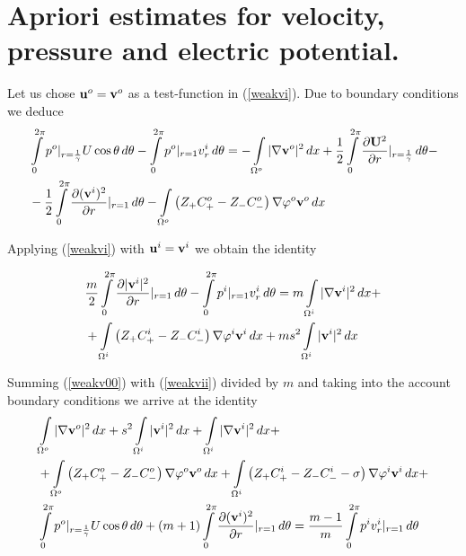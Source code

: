 \documentclass{amsart}
\begin{document}
\section{Apriori estimates for velocity, pressure and electric potential.}
Let us chose ${\bf u}^o={\bf v}^o$ as a test-function in (\ref{weakvi}). Due to boundary conditions we deduce
\begin{equation}\label{weakv00}
\begin{aligned}                 
&\int\limits_{0}^{2\pi}p^o|_{r=\frac{1}{\gamma}} U\cos\theta\,d\theta-\int\limits_{0}^{2\pi}p^o|_{r=1}{v_r^i}\,d\theta=-\int\limits_{\Omega^o}|\nabla{\bf v}^o|^2\,dx+\frac{1}{2}\int\limits_{0}^{2\pi}\frac{\partial {\bf U}^2 }{\partial r}|_{r=\frac{1}{\gamma}}\,d\theta-\\
&-\frac{1}{2}\int\limits_{0}^{2\pi}\frac{\partial ({\bf v}^i)^2} {\partial r}|_{r=1}\,d\theta
-\int\limits_{\Omega^o}\left(Z_{+}C^o_{+}-Z_{-}C^o_{-}\right)\nabla{\varphi^o}{\bf v}^o\,dx
\end{aligned}
\end{equation}

Applying (\ref{weakvi}) with ${\bf u}^i={\bf v}^i$ we obtain the identity

\begin{equation}\label{weakvii}
\begin{aligned}
&\frac{m}{2}\int\limits_{0}^{2\pi}\frac{\partial {|{\bf v}^i|^2} }{\partial r}|_{r=1}\,d\theta-\int\limits_{0}^{2\pi}p^i|_{r=1}{v_r^i}\,d\theta=m\int\limits_{\Omega^i}|\nabla{\bf v}^i|^2\,dx+\\
&+\int\limits_{\Omega^i}\left(Z_{+}C^i_{+}-Z_{-}C^i_{-}\right)\nabla{\varphi^i}{\bf v}^i\,dx+ms^2\int\limits_{\Omega^i}|{\bf v}^i|^2\,dx
\end{aligned}
\end{equation}

Summing (\ref{weakv00}) with (\ref{weakvii}) divided by $m$ and taking into the account boundary conditions we arrive at the identity
\begin{equation}\label{weakvsum}
\begin{aligned}
&\int\limits_{\Omega^o}|\nabla{\bf v}^o|^2\,dx+s^2\int\limits_{\Omega^i}|{\bf v}^i|^2\,dx+\int\limits_{\Omega^i}|\nabla{\bf v}^i|^2\,dx+\\
&+\int\limits_{\Omega^o}\left(Z_{+}C^o_{+}-Z_{-}C^o_{-}\right)\nabla{\varphi^o}{\bf v}^o\,dx+\int\limits_{\Omega^i}\left(Z_{+}C^i_{+}-Z_{-}C^i_{-}-\sigma\right)\nabla{\varphi^i}{\bf v}^i\,dx+\\
&\int\limits_{0}^{2\pi}p^o|_{r=\frac{1}{\gamma}} U\cos\theta\,d\theta+(m+1)\int\limits_{0}^{2\pi}\frac{\partial {({\bf v}^i)^2} }{\partial r}|_{r=1}\,d\theta=\frac{m-1}{m}\int\limits_{0}^{2\pi}p^i{v_r^i}|_{r=1}\,d\theta
\end{aligned}
\end{equation}
\end{document}
